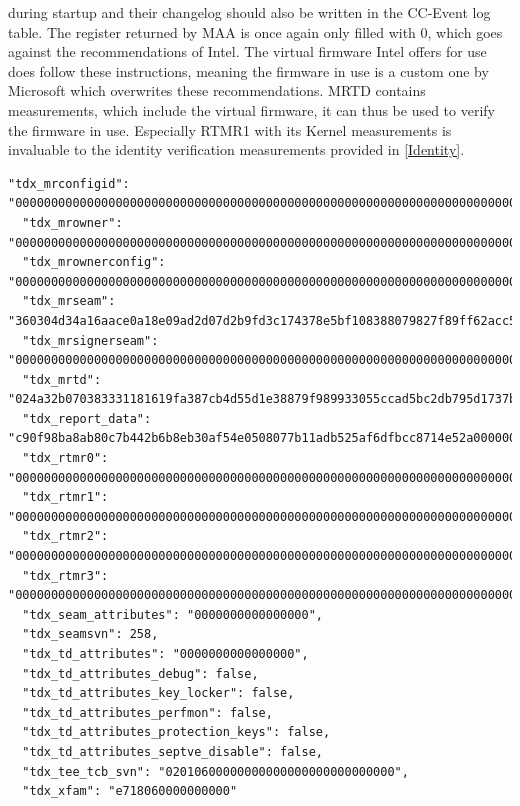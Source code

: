 during startup and their changelog should also be written in the CC-Event log table. The register returned by MAA is once again only filled with 0, which goes against the recommendations of Intel. The virtual firmware Intel offers for use does follow these instructions, meaning the firmware in use is a custom one by Microsoft which overwrites these recommendations. MRTD contains measurements, which include the virtual firmware, it can thus be used to verify the firmware in use. Especially RTMR1 with its Kernel measurements is invaluable to the identity verification measurements provided in \cref{Identity}.
\begin{lstlisting}[language=jsonmain,caption={TDX generated part of an MAA quote},captionpos=b]
  "tdx_mrconfigid": "000000000000000000000000000000000000000000000000000000000000000000000000000000000000000000000000",
  "tdx_mrowner": "000000000000000000000000000000000000000000000000000000000000000000000000000000000000000000000000",
  "tdx_mrownerconfig": "000000000000000000000000000000000000000000000000000000000000000000000000000000000000000000000000",
  "tdx_mrseam": "360304d34a16aace0a18e09ad2d07d2b9fd3c174378e5bf108388079827f89ff62acc5f8c473dd40706324834e202946",
  "tdx_mrsignerseam": "000000000000000000000000000000000000000000000000000000000000000000000000000000000000000000000000",
  "tdx_mrtd": "024a32b070383331181619fa387cb4d55d1e38879f989933055ccad5bc2db795d1737b66205949d15469dc8c1ba7ab7b",
  "tdx_report_data": "c90f98ba8ab80c7b442b6b8eb30af54e0508077b11adb525af6dfbcc8714e52a0000000000000000000000000000000000000000000000000000000000000000",
  "tdx_rtmr0": "000000000000000000000000000000000000000000000000000000000000000000000000000000000000000000000000",
  "tdx_rtmr1": "000000000000000000000000000000000000000000000000000000000000000000000000000000000000000000000000",
  "tdx_rtmr2": "000000000000000000000000000000000000000000000000000000000000000000000000000000000000000000000000",
  "tdx_rtmr3": "000000000000000000000000000000000000000000000000000000000000000000000000000000000000000000000000",
  "tdx_seam_attributes": "0000000000000000",
  "tdx_seamsvn": 258,
  "tdx_td_attributes": "0000000000000000",
  "tdx_td_attributes_debug": false,
  "tdx_td_attributes_key_locker": false,
  "tdx_td_attributes_perfmon": false,
  "tdx_td_attributes_protection_keys": false,
  "tdx_td_attributes_septve_disable": false,
  "tdx_tee_tcb_svn": "02010600000000000000000000000000",
  "tdx_xfam": "e718060000000000"
\end{lstlisting}
\label{td_quote}


